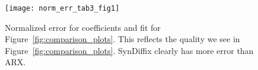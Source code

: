 
        \begin{figure}
        \begin{center}
        \texttt{[image: norm\_err\_tab3\_fig1]}
        \caption{Normalized error for coefficients and fit for Figure~\ref{fig:comparison_plots}. This reflects the quality we see in Figure~\ref{fig:comparison_plots}. SynDiffix clearly has more error than ARX.
        }
        \end{center}
        \end{figure}
    